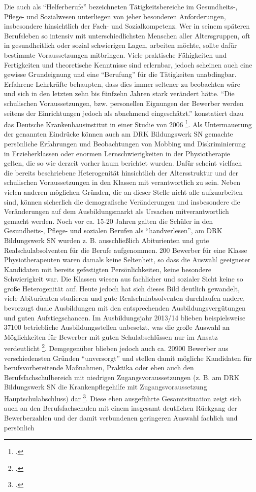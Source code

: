 Die auch als "`Helferberufe"' bezeichneten Tätigkeitsbereiche im Gesundheits-, Pflege- und Sozialwesen unterliegen von jeher besonderen Anforderungen, insbesondere hinsichtlich der Fach- und Sozialkompetenz. Wer in seinem späteren Berufsleben so intensiv mit unterschiedlichsten Menschen aller Altersgruppen, oft in gesundheitlich oder sozial schwierigen Lagen, arbeiten möchte, sollte dafür bestimmte Voraussetzungen mitbringen. Viele praktische Fähigkeiten und Fertigkeiten und theoretische Kenntnisse sind erlernbar, jedoch scheinen auch eine gewisse Grundeignung und eine "`Berufung"' für die Tätigkeiten unabdingbar. Erfahrene Lehrkräfte behaupten, dass dies immer seltener zu beobachten wäre und sich in den letzten zehn bis fünfzehn Jahren stark verändert hätte. "`Die schulischen Voraussetzungen, bzw. personellen Eignungen der Bewerber werden seitens der Einrichtungen jedoch als abnehmend eingeschätzt."' konstatiert dazu das Deutsche Krankenhausinstitut in einer Studie von 2006 \footcite[8]{Krankenhausinstitut2006}. Als Untermauerung der genannten Eindrücke können auch am DRK Bildungswerk SN gemachte persönliche Erfahrungen und Beobachtungen von Mobbing und Diskriminierung in Erzieherklassen oder enormen Lernschwierigkeiten in der Physiotherapie gelten, die so wie derzeit vorher kaum berichtet wurden. Dafür scheint vielfach die bereits beschriebene Heterogenität hinsichtlich der Altersstruktur und der schulischen Voraussetzungen in den Klassen mit verantwortlich zu sein. Neben vielen anderen möglichen Gründen, die an dieser Stelle nicht alle aufzuarbeiten sind, können sicherlich die demografische Veränderungen und insbesondere die Veränderungen auf dem Ausbildungsmarkt als Ursachen mitverantwortlich gemacht werden. Noch vor ca. 15-20 Jahren galten die Schüler in den Gesundheits-, Pflege- und sozialen Berufen als "`handverlesen"', am DRK Bildungswerk SN wurden z. B. ausschließlich Abiturienten und gute Realschulabsolventen für die Berufe aufgenommen. 200 Bewerber für eine Klasse Physiotherapeuten waren damals keine Seltenheit, so dass die Auswahl geeigneter Kandidaten mit bereits gefestigten Persönlichkeiten, keine besondere Schwierigkeit war. Die Klassen wiesen aus fachlicher und sozialer Sicht keine so große Heterogenität auf. Heute jedoch hat sich dieses Bild deutlich gewandelt, viele Abiturienten studieren und  gute Realschulabsolventen durchlaufen andere, bevorzugt duale Ausbildungen mit den entsprechenden Ausbildungsvergütungen und guten Aufstiegschancen. Im Ausbildungsjahr 2013/14 blieben beispielsweise 37100 betriebliche Ausbildungsstellen unbesetzt, was die große Auswahl an Möglichkeiten für Bewerber mit guten Schulabschlüssen nur im Ansatz verdeutlicht \footcite[vgl.][15]{BBF2015}. Demgegenüber blieben jedoch auch ca. 20900 Bewerber aus verschiedensten Gründen "`unversorgt"' und stellen damit mögliche Kandidaten für berufsvorbereitende Maßnahmen, Praktika oder eben auch den Berufsfachschulbereich mit niedrigen Zugangsvoraussetzungen (z. B. am DRK Bildungswerk SN die Krankenpflegehilfe mit Zugangsvoraussetzung Hauptschulabschluss) dar \footcite[vgl.][15]{BBF2015}. Diese eben ausgeführte Gesamtsituation zeigt sich auch an den Berufsfachschulen mit einem insgesamt deutlichen Rückgang der Bewerberzahlen und der damit verbundenen geringeren Auswahl fachlich und persönlich 